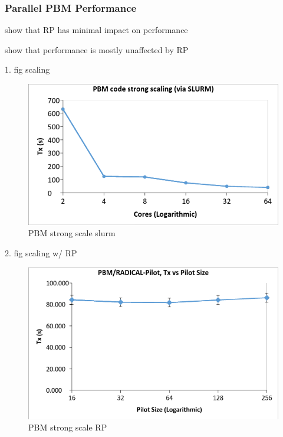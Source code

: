 \documentclass[preprint,11pt,authoryear]{elsarticle}
\begin{document}
    \subsubsection{Parallel PBM Performance}
     \par show that RP has minimal impact on performance 
    \par show that performance is mostly unaffected by RP 
    \par 1. fig scaling 
      \begin{figure}[H]
      \centering
      \includegraphics[scale=0.5]{rslts_strong_scale_slurm}
      \caption{ PBM strong scale slurm}
      \label{fig:rslts_pbm_strong_scale}
      \end{figure}
    \par 2. fig scaling w/ RP  
      \begin{figure}[H]
      \centering
      \includegraphics[scale=0.5]{rslts_pbmbyrp_strng}
      \caption{ PBM strong scale RP}
      \label{fig:rslts_pbmbyrp_strng}
      \end{figure} 
      
\end{document}
